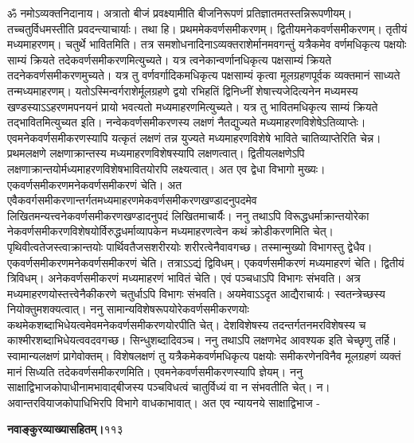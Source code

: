 \documentclass[11pt, openany]{book}
\begin{document}
\begin{sloppypar}
\hangindent=0.2in \hspace{0.2in}ॐ नमोऽव्यक्तनिदानाय। अत्रातो बीजं प्रवक्ष्यामीति बीजनिरूपणं प्रतिज्ञातमतस्तन्निरूपणीयम्। तच्चतुर्विधमस्तीति प्रवदन्त्याचार्याः। तथा हि। प्रथममेकवर्णसमीकरणम्। द्वितीयमनेकवर्णसमीकरणम्। तृतीयं मध्यमाहरणम्। चतुर्थे भावितमिति। तत्र समशोधनादिनाऽव्यक्तराशेर्मानमवगन्तुं यत्रैकमेव वर्णमधिकृत्य पक्षयोः साम्यं क्रियते तदेकवर्णसमीकरणमित्युच्यते। यत्र त्वनेकान्वर्णानधिकृत्य पक्षसाम्यं क्रियते तदनेकवर्णसमीकरणमुच्यते। यत्र तु वर्णवर्गादिकमधिकृत्य पक्षसाम्यं कृत्वा मूलग्रहणपूर्वक व्यक्तमानं साध्यते तन्मध्यमाहरणम्। यतोऽस्मिन्वर्गराशेर्मूलग्रहणे द्वयो रभिहतिं द्विनिध्नीं शेषात्त्यजेदित्यनेन मध्यमस्य खण्डस्याऽऽहरणमपनयनं प्रायो भवत्यतो मध्यमाहरणमित्युच्यते। यत्र तु भावितमधिकृत्य साम्यं क्रियते तद्भावितमित्युच्यत इति। नन्वेकवर्णसमीकरणस्य लक्षणं नैतद्युज्यते मध्यमाहरणविशेषेऽतिव्याप्तेः। एवमनेकवर्णसमीकरणस्यापि यत्कृतं लक्षणं तन्न युज्यते मध्यमाहरणविशेषे भाविते चातिव्याप्तेरिति चेन्न। प्रथमलक्षणे लक्षणाक्रान्तस्य मध्यमाहरणविशेषस्यापि लक्षणत्वात्। द्वितीयलक्षणेऽपि लक्षणाक्रान्तयोर्मध्यमाहरणविशेषभावितयोरपि लक्ष्यत्वात्। अत एव द्वेधा विभागो मुख्यः। एकवर्णसमीकरणमनेकवर्णसमीकरणं चेति। अत एवैकवर्गसमीकरणान्तर्गतमध्यमाहरणमेकवर्णसमीकरणखण्डादनुपदमेव लिखितमन्यत्त्वनेकवर्णसमीकरणखण्डादनुपदं लिखितमाचार्यैः। ननु तथाऽपि विरूद्धधर्माक्रान्तयोरेका नेकवर्णसमीकरणविशेषयोर्विरुद्धधर्माव्यापकेन मध्यमाहरणत्वेन कथं क्रोडीकरणमिति चेत्। पृथिवीत्वतेजस्त्वाक्रान्तयोः पार्थिवतैजसशरीरयोः शरीरत्वेनैवावगच्छ। तस्मान्मुख्यो विभागस्तु द्वेधैव। एकवर्णसमीकरणमनेकवर्णसमीकरणं चेति। तत्राऽऽद्यं द्विविधम्। एकवर्णसमीकरणं मध्यमाहरणं चेति। द्वितीयं त्रिविधम्। अनेकवर्णसमीकरणं मध्यमाहरणं भावितं चेति। एवं पञ्चधाऽपि विभागः संभवति। अत्र मध्यमाहरणयोस्तत्त्वेनैकीकरणे चतुर्धाऽपि विभागः संभवति। अयमेवाऽऽदृत आद्यैराचार्यः। स्वतन्त्रेच्छस्य नियोक्तुमशक्यत्वात्। ननु सामान्यविशेषरूपयोरेकवर्णसमीकरणयोः कथमेकशब्दाभिधेयत्वमेवमनेकवर्णसमीकरणयोरपीति चेत्। देशविशेषस्य तदन्तर्गतनमरविशेषस्य च काश्मीरशब्दाभिधेयत्ववदवगच्छ। सिन्धुशब्दादिवञ्च। ननु तथाऽपि लक्षणभेद आवश्यक इति चेच्छृणु तर्हि। स्वामान्यलक्षणं प्रागेवोक्तम्। विशेषलक्षणं तु यत्रैकमेकवर्णमधिकृत्य पक्षयोः समीकरणेनविनैव मूलग्रहणं व्यक्तं मानं सिध्यति तदेकवर्णसमीकरणमिति। एवमनेकवर्णसमीकरणस्यापि ज्ञेयम्। ननु साक्षाद्विभाजकोपाधीनामभावाद्बीजस्य पञ्चविधत्वं चातुर्विध्यं वा न संभवतीति चेत्। न। अवान्तरवियाजकोपाधिभिरपि विभागे वाधकाभावात्। अत एव न्यायनये साक्षाद्विभाज - 
\end{sloppypar}
\thispagestyle{empty}
\newpage

\onehalfspacing
\hspace{2in}\textbf{नवाङ्कुरव्याख्यासहितम्।}\hspace{2in}११३
\end{document}
